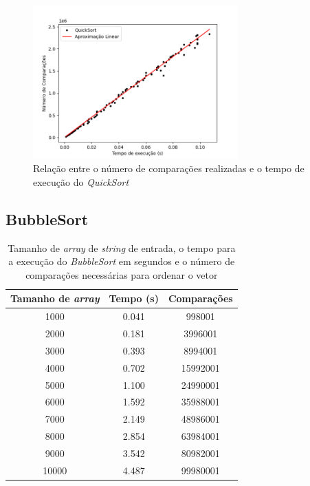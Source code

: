\documentclass[12pt,a4paper,oneside]{article}
\begin{document}
\begin{figure}[H]
\begin{center}
    \includegraphics[width=0.7\textwidth]{FigTNQ.png} 
\end{center}
\caption{Relação entre o número de comparações realizadas e o tempo de execução do \textit{QuickSort}}
\label{fig:ntq}
\end{figure}

\subsection{BubbleSort}

\begin{table}[H]
\caption{Tamanho de \textit{array} de \textit{string} de entrada, o tempo para a execução do \textit{BubbleSort} em segundos e o número de comparações necessárias para ordenar o vetor }
\label{tab:db}
\begin{center}
\begin{tabular}{|c c c|}
\hline
Tamanho de \textit{array}	& Tempo (s)	& Comparações 	\\
\hline
1000 & 0.041 & 998001\\
2000 & 0.181 & 3996001\\
3000 & 0.393 & 8994001\\
4000 & 0.702 & 15992001\\
5000 & 1.100 & 24990001\\
6000 & 1.592 & 35988001\\
7000 & 2.149 & 48986001\\
8000 & 2.854 & 63984001\\
9000 & 3.542 & 80982001\\
10000 & 4.487 & 99980001\\
\hline
\end{tabular}
\end{center}
\end{table}
\end{document}
